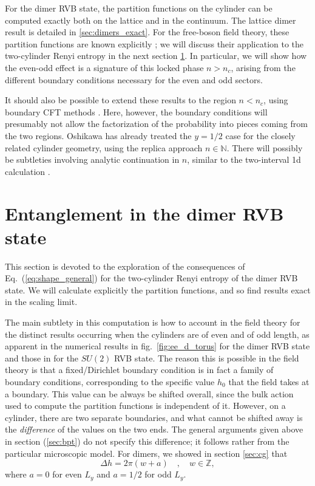 \documentclass[11pt]{iopart}
\begin{document}
For the dimer RVB state, the partition functions on the cylinder can be computed exactly both on the lattice and in the continuum.  The lattice dimer result is detailed in \ref{sec:dimers_exact}. For the free-boson field theory, these partition functions are known explicitly \cite{BigYellowBook};  we will discuss their application to the two-cylinder Renyi entropy in the next section \ref{sec:dimers_entanglement}. In particular, we will show how the even-odd effect is a signature of this locked phase  $n>n_c$, arising from the different boundary conditions necessary for the even and odd sectors.


It should also be possible to extend these results to the region $n<n_c$, using boundary CFT methods \cite{Shannonee,Oshikawa,Zaletel,Stephan2011}. Here, however, the boundary conditions will presumably not allow the factorization of the probability into pieces coming from the two regions. Oshikawa\cite{Oshikawa} has already treated the $y=1/2$ case for the closely related cylinder geometry, using the replica approach $n\in \mathbb{N}$. There will possibly be subtleties involving analytic continuation in $n$, similar to the two-interval 1d calculation \cite{CCT1,CCT2}.


\section{Entanglement in the dimer RVB state}
\label{sec:dimers_entanglement}

This section is devoted to the exploration of the consequences of Eq.~(\ref{eq:shape_general}) for the two-cylinder Renyi entropy of the dimer RVB state. We will calculate explicitly the partition functions, and so find results exact in the scaling limit. 

The main subtlety in this computation is how to account in the field theory for the distinct results occurring when the cylinders are of even and of odd length, as apparent in the numerical results in fig.\ \ref{fig:ee_d_torus} for the dimer RVB state and those in \cite{Ju2012} for the $SU(2)$ RVB state. The reason this is possible in the field theory is that a fixed/Dirichlet boundary condition is in fact a family of boundary conditions, corresponding to the specific value $h_0$ that the field takes at a boundary. This value can be always be shifted overall, since the bulk action used to compute the partition functions is independent of it. However, on a cylinder, there are two separate boundaries, and what cannot be shifted away is the {\em difference} of the values on the two ends.    
The general arguments given above in section (\ref{sec:bpt}) do not specify this difference; it follows rather from the particular microscopic model. For dimers, we showed in section \ref{sec:cg} that 
\begin{equation}
 \Delta h =2\pi (w+a)\quad,\quad w \in \mathbb{Z},
\end{equation}
where $a=0$ for even $L_y$ and $a=1/2$ for odd $L_y$. 
\end{document}
